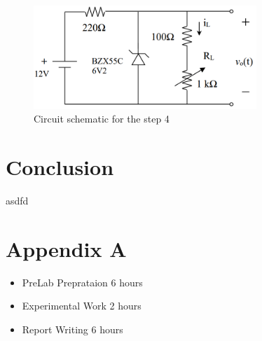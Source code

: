 \documentclass[letterpaper,12pt]{article}
\begin{document}
\begin{figure}[H]
    \centering
    \includegraphics[width = 0.75\textwidth]{4_1.png}
    \caption{Circuit schematic for the step 4}
\end{figure} 
    
    
\section{Conclusion}
asdfd
\section*{Appendix A}
\begin{itemize}
    \item PreLab Preprataion 6 hours
    \item Experimental Work 2  hours
    \item Report Writing 6 hours
\end{itemize}
\end{document}
